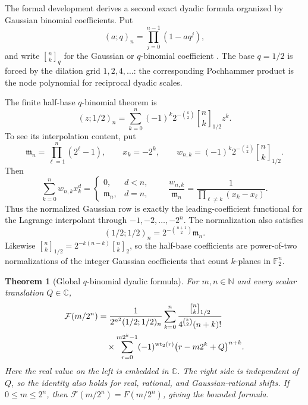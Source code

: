 \documentclass[11pt,oneside]{article}
\newtheorem{theorem}{Theorem}[section]
\theoremstyle{definition}
\theoremstyle{remark}
\newcommand{\C}{\mathbb C}
\newcommand{\N}{\mathbb N}
\newcommand{\wt}{\operatorname{wt}_2}
\newcommand{\qbinom}[3]{\genfrac{[}{]}{0pt}{}{#1}{#2}_{#3}}
\begin{document}
The formal development derives a second exact dyadic formula organized by Gaussian
binomial coefficients.  Put
\begin{equation}
 (a;q)_n=\prod_{j=0}^{n-1}(1-aq^j),                        \label{eq:qpochhammer}
\end{equation}
and write $\qbinom nkq$ for the Gaussian or $q$-binomial coefficient
\cite{andrews1976,gasper2004,kac2002,dlmf17}.  The base $q=1/2$
is forced by the dilation grid $1,2,4,\ldots$: the corresponding Pochhammer product is the
node polynomial for reciprocal dyadic scales.

The finite half-base $q$-binomial theorem is
\begin{equation}
 (z;1/2)_n=\sum_{k=0}^{n}
 (-1)^k2^{-\binom k2}\qbinom nk{1/2}z^k.                 \label{eq:half-q-binomial-theorem}
\end{equation}
To see its interpolation content, put
\begin{equation*}
 \mathfrak m_n=\prod_{\ell=1}^{n}(2^\ell-1),\qquad
 x_k=-2^k,\qquad
 w_{n,k}=(-1)^k2^{-\binom k2}\qbinom nk{1/2}.
\end{equation*}
Then
\begin{equation}
 \sum_{k=0}^{n}w_{n,k}x_k^d=
 \begin{cases}
 0,&d<n,\\
 \mathfrak m_n,&d=n,
 \end{cases}
 \qquad
 \frac{w_{n,k}}{\mathfrak m_n}
 =\frac1{\prod_{\ell\ne k}(x_k-x_\ell)}.                 \label{eq:q-geometric-interpolation}
\end{equation}
Thus the normalized Gaussian row is exactly the leading-coefficient functional for the
Lagrange interpolant through $-1,-2,\ldots,-2^n$.  The normalization also satisfies
\begin{equation}
 (1/2;1/2)_n=2^{-\binom{n+1}{2}}\mathfrak m_n.            \label{eq:half-q-mersenne}
\end{equation}
Likewise
$\qbinom nk{1/2}=2^{-k(n-k)}\qbinom nk2$, so the half-base coefficients are
power-of-two normalizations of the integer Gaussian coefficients that count
$k$-planes in $\mathbb F_2^n$.

\begin{theorem}[Global $q$-binomial dyadic formula]
For $m,n\in\N$ and every scalar translation $Q\in\C$,
\begin{align}
 \mathcal F(m/2^n)
 &=\frac{1}{2^{n^2}(1/2;1/2)_n}
 \sum_{k=0}^{n}
 \frac{\qbinom nk{1/2}}
 {4^{\binom k2}(n+k)!}                                    \notag\\
 &\quad\times
 \sum_{r=0}^{m2^k-1}(-1)^{\wt(r)}
 \bigl(r-m2^k+Q\bigr)^{n+k}.                              \label{eq:qbinomial-dyadic}
\end{align}
Here the real value on the left is embedded in $\C$.  The right side is independent of
$Q$, so the identity also holds for real, rational, and Gaussian-rational shifts.  If
$0\le m\le2^n$, then $\mathcal F(m/2^n)=F(m/2^n)$, giving the bounded formula.
\end{theorem}
\end{document}
